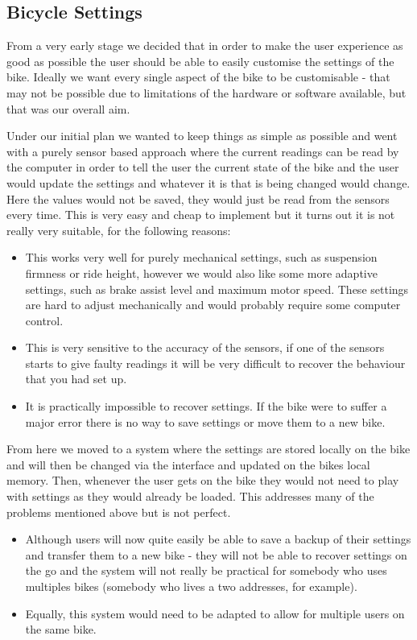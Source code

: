 \documentclass[a4paper]{report}
\begin{document}
\subsection{Bicycle Settings}
From a very early stage we decided that in order to make the user experience as good as possible the user should be able to easily customise the settings of the bike. Ideally we want every single aspect of the bike to be customisable - that may not be possible due to limitations of the hardware or software available, but that was our overall aim. 

Under our initial plan we wanted to keep things as simple as possible and went with a purely sensor based approach where the current readings can be read by the computer in order to tell the user the current state of the bike and the user would update the settings and whatever it is that is being changed would change. Here the values would not be saved, they would just be read from the sensors every time. This is very easy and cheap to implement but it turns out it is not really very suitable, for the following reasons:
\begin{itemize}
  \item This works very well for purely mechanical settings, such as suspension firmness or ride height, however we would also like some more adaptive settings, such as brake assist level and maximum motor speed. These settings are hard to adjust mechanically and would probably require some computer control.
  \item This is very sensitive to the accuracy of the sensors, if one of the sensors starts to give faulty readings it will be very difficult to recover the behaviour that you had set up.
  \item It is practically impossible to recover settings. If the bike were to suffer a major error there is no way to save settings or move them to a new bike.
\end{itemize}
From here we moved to a system where the settings are stored locally on the bike and will then be changed via the interface and updated on the bikes local memory. Then, whenever the user gets on the bike they would not need to play with settings as they would already be loaded. This addresses many of the problems mentioned above but is not perfect.
\begin{itemize}
  \item Although users will now quite easily be able to save a backup of their settings and transfer them to a new bike - they will not be able to recover settings on the go and the system will not really be practical for somebody who uses multiples bikes (somebody who lives a two addresses, for example).
  \item Equally, this system would need to be adapted to allow for multiple users on the same bike.
\end{itemize}
\end{document}

